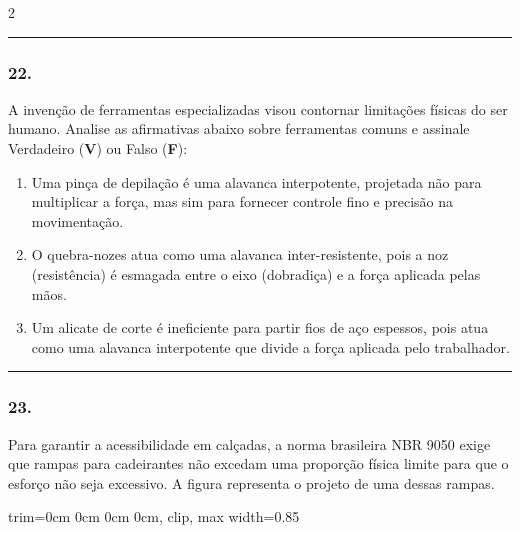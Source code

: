 \documentclass[twoside, 10pt, a4paper]{article}
\newlength{\espacoPreQuestao}
\newlength{\espacoQuestao}
\newlength{\espacoAlt}
\newcommand{\larguraTikz}{0.85\linewidth} %
\begin{document}
\begin{multicols*}{2}
\noindent\textcolor{CorLinha}{\rule{\linewidth}{0.5pt}} 
\par\vspace{\espacoPreQuestao}
\subsubsection*{22.} A invenção de ferramentas especializadas visou contornar limitações físicas do ser humano. Analise as afirmativas abaixo sobre ferramentas comuns e assinale Verdadeiro (\textbf{V}) ou Falso (\textbf{F}):
\begin{enumerate}[label=\Roman*., itemsep=\espacoAlt]
    \item Uma pinça de depilação é uma alavanca interpotente, projetada não para multiplicar a força, mas sim para fornecer controle fino e precisão na movimentação.
    \item O quebra-nozes atua como uma alavanca inter-resistente, pois a noz (resistência) é esmagada entre o eixo (dobradiça) e a força aplicada pelas mãos.
    \item Um alicate de corte é ineficiente para partir fios de aço espessos, pois atua como uma alavanca interpotente que divide a força aplicada pelo trabalhador.
\end{enumerate}
\par\vspace{\espacoQuestao}

\noindent\textcolor{CorLinha}{\rule{\linewidth}{0.5pt}} 
\par\vspace{\espacoPreQuestao}
\subsubsection*{23.} Para garantir a acessibilidade em calçadas, a norma brasileira NBR 9050 exige que rampas para cadeirantes não excedam uma proporção física limite para que o esforço não seja excessivo. A figura representa o projeto de uma dessas rampas.
\begin{center}
\begin{adjustbox}{trim=0cm 0cm 0cm 0cm, clip, max width=\larguraTikz}
\end{adjustbox}
\end{center}
\end{multicols*}
\end{document}
